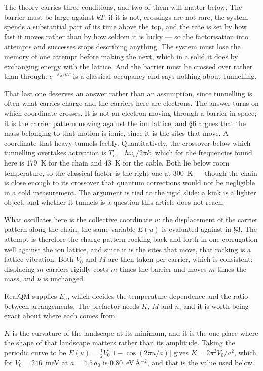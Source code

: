 \documentclass[11pt]{article}
\newcommand{\half}{\tfrac12}
\begin{document}
The theory carries three conditions, and two of them will matter below. The barrier must be large
against $kT$: if it is not, crossings are not rare, the system spends a substantial part of its time
above the top, and the rate is set by how fast it moves rather than by how seldom it is lucky --- so
the factorisation into attempts and successes stops describing anything. The system must lose
the memory of one attempt before making the next, which in a solid it does by exchanging energy with
the lattice. And the barrier must be crossed over rather than through: $e^{-E_a/kT}$ is a classical
occupancy and says nothing about tunnelling.

That last one deserves an answer rather than an assumption, since tunnelling is often what carries
charge and the carriers here are electrons. The answer turns on which coordinate crosses. It is not
an electron moving through a barrier in space; it is the carrier pattern moving against the ion
lattice, and \S6 argues that the mass belonging to that motion is ionic, since it is the sites that
move. A coordinate that heavy tunnels feebly. Quantitatively, the crossover below which tunnelling
overtakes activation is $T_c=\hbar\omega_b/2\pi k$, which for the frequencies found here is
$179$~K for the chain and $43$~K for the cable. Both lie below room temperature, so the classical
factor is the right one at $300$~K --- though the chain is close enough to its crossover that
quantum corrections would not be negligible in a cold measurement. The argument is tied to the rigid
slide: a kink is a lighter object, and whether it tunnels is a question this article does not
reach.

What oscillates here is the collective coordinate $u$: the displacement of the carrier pattern along
the chain, the same variable $E(u)$ is evaluated against in \S3. The attempt is therefore the charge
pattern rocking back and forth in one corrugation well against the ion lattice, and since it is the
sites that move, that rocking is a lattice vibration. Both $V_0$ and $M$ are then taken per carrier,
which is consistent: displacing $m$ carriers rigidly costs $m$ times the barrier and moves $m$ times
the mass, and $\nu$ is unchanged.

RealQM supplies $E_a$, which decides the temperature dependence and the ratio between arrangements. The prefactor needs $K$, $M$ and $n$, and it is worth being exact about where each comes
from.

$K$ is the curvature of the landscape at its minimum, and it is the one place where the shape of
that landscape matters rather than its amplitude. Taking the periodic curve to be
$E(u)=\half V_0\bigl[1-\cos(2\pi u/a)\bigr]$ gives $K=2\pi^2V_0/a^2$, which for $V_0=246$~meV at
$a=4.5\,a_0$ is $0.80$~eV\,\AA$^{-2}$, and that is the value used below.
\end{document}

